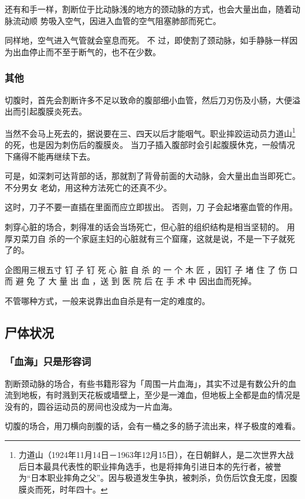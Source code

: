 \documentclass[UTF8]{ctexart}
\begin{document}
还有和手一样，割断位于比动脉浅的地方的颈动脉的方式，也会大量出血，随着动脉流动顺 势吸入空气，因进入血管的空气阻塞肺部而死亡。

同样地，空气进入气管就会窒息而死。
不 过，即使割了颈动脉，如手静脉一样因为出血停止而不至于断气的，也不在少数。

\subsubsection{其他}

切腹时，首先会割断许多不足以致命的腹部细小血管，然后刀刃伤及小肠，大便溢出而引起腹膜炎死去。

当然不会马上死去的，据说要在三、四天以后才能咽气。职业摔跤运动员力道山\footnote{力道山（1924年11月14日－1963年12月15日），在日朝鲜人，是二次世界大战后日本最具代表性的职业摔角选手，也是将摔角引进日本的先行者，被誉为“日本职业摔角之父”。因与极道发生争执，被刺杀，负伤后饮食无度，因腹膜炎而死，时年四十。}的死，也是因为刺伤后的腹膜炎。
当刀子插入腹部时会引起腹膜休克，一般情况下痛得不能再继续下去。

可是，如深刺可达背部的话，那就割了背骨前面的大动脉，会大量出血当即死亡。
不分男女 老幼，用这种方法死亡的还真不少。

这时，刀子不要一直插在里面而应立即拔出。
否则，刀 子会起堵塞血管的作用。 

刺穿心脏的场合，刺得准的话会当场死亡，但心脏的组织结构是相当坚韧的。
用厚刃菜刀自 杀的一个家庭主妇的心脏就有三个窟窿，这就是说，不是一下子就死了的。

企图用三根五寸 钉 子 钉 死 心 脏 自 杀 的 一 个 木 匠 ，因钉 子 堵 住 了 伤 口 而 避 免 了 大 量 出 血 ，送 到 医 院 后 在 手 术 中 因出血而死掉。

不管哪种方式，一般来说靠出血自杀是有一定的难度的。

\subsection{尸体状况}

\subsubsection*{「血海」只是形容词}

割断颈动脉的场合，有些书籍形容为「周围一片血海」，其实不过是有数公升的血流到地板，有时溅到天花板或墙壁上，至少是一滩血，但地板上全都是血的情况是没有的，圆谷运动员的房间也没成为一片血海。

切腹的场合，用刀横向剖腹的话，会有一桶之多的肠子流出来，样子极度的难看。
\end{document}
